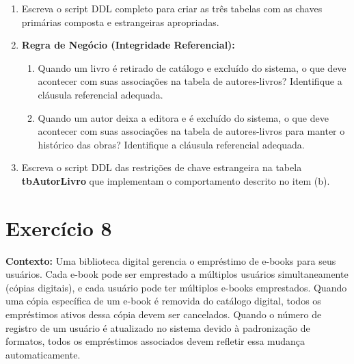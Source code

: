 \documentclass[12pt,a4paper]{article}
\newcommand{\resposta}[1]{}
\begin{document}
\begin{enumerate}[label=\textbf{\alph*)}]
    \item Escreva o script DDL completo para criar as três tabelas com as chaves primárias composta e estrangeiras apropriadas.
    \resposta{4cm}
    
    \item \textbf{Regra de Negócio (Integridade Referencial):} 
    \begin{enumerate}[label=\arabic*.]
        \item Quando um livro é retirado de catálogo e excluído do sistema, o que deve acontecer com suas associações na tabela de autores-livros? Identifique a cláusula referencial adequada.
        \item Quando um autor deixa a editora e é excluído do sistema, o que deve acontecer com suas associações na tabela de autores-livros para manter o histórico das obras? Identifique a cláusula referencial adequada.
    \end{enumerate}
    \resposta{3cm}
    
    \item Escreva o script DDL das restrições de chave estrangeira na tabela \textbf{tbAutorLivro} que implementam o comportamento descrito no item (b).
    \resposta{3cm}
\end{enumerate}

\section*{Exercício 8}

\textbf{Contexto:} Uma biblioteca digital gerencia o empréstimo de e-books para seus usuários. Cada e-book pode ser emprestado a múltiplos usuários simultaneamente (cópias digitais), e cada usuário pode ter múltiplos e-books emprestados. Quando uma cópia específica de um e-book é removida do catálogo digital, todos os empréstimos ativos dessa cópia devem ser cancelados. Quando o número de registro de um usuário é atualizado no sistema devido à padronização de formatos, todos os empréstimos associados devem refletir essa mudança automaticamente.
\end{document}
